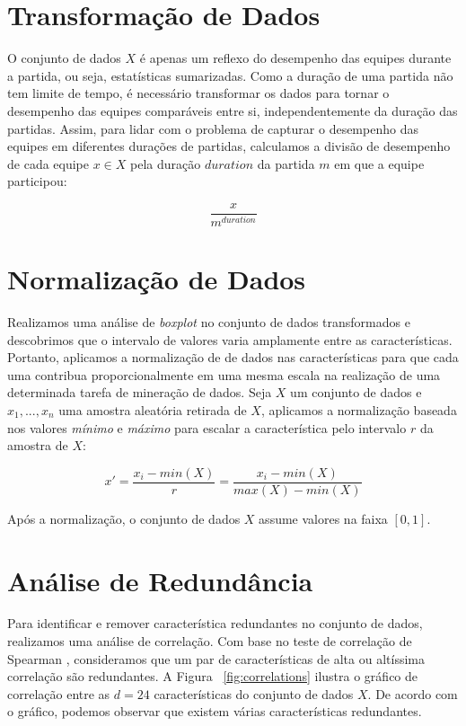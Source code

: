 \section{Transformação de Dados}
O conjunto de dados $X$ é apenas um reflexo do desempenho das equipes durante a partida, ou seja, estatísticas sumarizadas. Como a duração de uma partida não tem limite de tempo, é necessário transformar os dados para tornar o desempenho das equipes comparáveis entre si, independentemente da duração das partidas. Assim, para lidar com o problema de capturar o desempenho das equipes em diferentes durações de partidas, calculamos a divisão de desempenho de cada equipe $x \in X$ pela duração $duration$ da partida $m$ em que a equipe participou:

\begin{displaymath}
  \frac{x}{m^{duration}}
\end{displaymath}

\section{Normalização de Dados}
Realizamos uma análise de \textit{boxplot} no conjunto de dados transformados e descobrimos que o intervalo de valores varia amplamente entre as características. Portanto, aplicamos a normalização de de dados \cite{zaki2014data} nas características para que cada uma contribua proporcionalmente em uma mesma escala na realização de uma determinada tarefa de mineração de dados. Seja $X$ um conjunto de dados e $x_1, ..., x_n $ uma amostra aleatória retirada de $X$, aplicamos a normalização baseada nos valores \textit{mínimo} e \textit{máximo} para escalar a característica pelo intervalo $r$ da amostra de $X$:

\begin{displaymath}
  x'=\frac{x_i - min(X)}{r}=\frac{x_i - min(X)}{max(X)-min(X)}
\end{displaymath}

Após a normalização, o conjunto de dados $X$ assume valores na faixa $[0, 1]$.

\section{Análise de Redundância}

Para identificar e remover característica redundantes no conjunto de dados, realizamos uma análise de correlação. Com base no teste de correlação de Spearman \cite{xiao2015using}, consideramos que um par de características de alta ou altíssima correlação são redundantes. A Figura ~\ref{fig:correlations} ilustra o gráfico de correlação entre as $d=24$ características do conjunto de dados $X$. De acordo com o gráfico, podemos observar que existem várias características redundantes.

